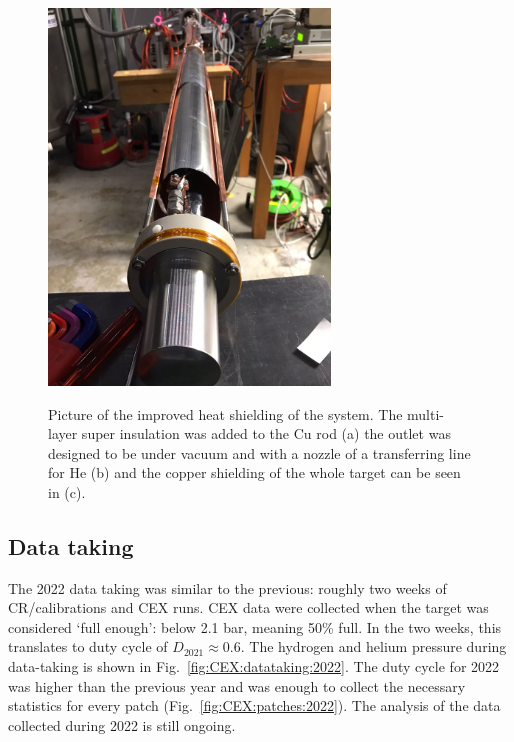 \begin{refsection}
\begin{figure}
{            \includegraphics[height = 10cm, keepaspectratio]{Figures/LH2/2022/CEX2022_shielding.jpeg}}
            \caption[CEX 2022: Improved insulation on all components]{Picture of the improved heat shielding of the system. The multi-layer super insulation was added to the Cu rod (a) the outlet was designed to be under vacuum and with a nozzle of a transferring line for He (b) and the copper shielding of the whole target can be seen in (c).}
            \label{fig:CEX:2022:insulation}
        \end{figure}
        
    \subsection{Data taking}
        The 2022 data taking was similar to the previous: roughly two weeks of CR/calibrations and CEX runs.
        CEX data were collected when the target was considered `full enough': below 2.1 bar, meaning 50\% full. 
        In the two weeks, this translates to duty cycle of $D_{2021}\approx0.6$.
        The hydrogen and helium pressure during data-taking is shown in Fig.~\ref{fig:CEX:datataking:2022}.
        The duty cycle for 2022 was higher than the previous year and was enough to collect the necessary statistics for every patch (Fig.~\ref{fig:CEX:patches:2022}).
        The analysis of the data collected during 2022 is still ongoing.


\end{refsection}
